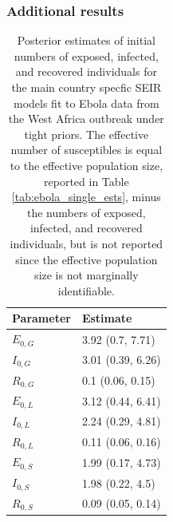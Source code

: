 \subsubsection{Additional results}
\label{subsubsec:ebola_single_res}


\begin{table}[htbp]
	\caption[Posterior estimates of initial numbers of exposed, infected, and recovered individuals for country--specific SEIR models fit to Ebola outbreak data.]{Posterior estimates of initial numbers of exposed, infected, and recovered individuals for the main country specfic SEIR models fit to Ebola data from the West Africa outbreak under tight priors. The effective number of susceptibles is equal to the effective population size, reported in Table \ref{tab:ebola_single_ests}, minus the numbers of exposed, infected, and recovered individuals, but is not reported since the effective population size is not marginally identifiable.}
	\label{tab:ebola_single_initdist_res}
	\centering
	\begin{tabular}{ll}
		\hline
		\textbf{Parameter} & \textbf{Estimate }\\ 
		\hline
		$ E_{0,G} $& 3.92 (0.7, 7.71) \\ 
		$ I_{0,G} $& 3.01 (0.39, 6.26) \\ 
		$ R_{0,G} $& 0.1 (0.06, 0.15) \\ 
		\hline
		$ E_{0,L} $& 3.12 (0.44, 6.41) \\ 
		$ I_{0,L} $& 2.24 (0.29, 4.81) \\ 
		$ R_{0,L} $& 0.11 (0.06, 0.16) \\ 
		\hline
		$ E_{0,S} $& 1.99 (0.17, 4.73) \\ 
		$ I_{0,S} $& 1.98 (0.22, 4.5) \\ 
		$ R_{0,S} $& 0.09 (0.05, 0.14) \\ 
		\hline
	\end{tabular}
\end{table}

